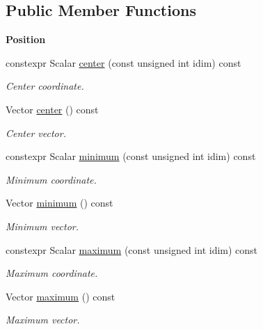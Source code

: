 \subsection*{Public Member Functions}
\begin{Indent}{\bf Position}\par
\begin{DoxyCompactItemize}
\item 
constexpr Scalar \hyperlink{classmagrathea_1_1AbstractHyperSphere_a3dd8d25adc4df0a1aa1878f3b3f48835}{center} (const unsigned int idim) const 
\begin{DoxyCompactList}\small\item\em Center coordinate. \end{DoxyCompactList}\item 
Vector \hyperlink{classmagrathea_1_1AbstractHyperSphere_af16c5565a4d7819aa6db90f599a264fd}{center} () const 
\begin{DoxyCompactList}\small\item\em Center vector. \end{DoxyCompactList}\item 
constexpr Scalar \hyperlink{classmagrathea_1_1AbstractHyperSphere_a9c76e88eea428b595fe1ca44c43bb4e4}{minimum} (const unsigned int idim) const 
\begin{DoxyCompactList}\small\item\em Minimum coordinate. \end{DoxyCompactList}\item 
Vector \hyperlink{classmagrathea_1_1AbstractHyperSphere_a1aec8b8788f5b20154efd0b9fa6bc75a}{minimum} () const 
\begin{DoxyCompactList}\small\item\em Minimum vector. \end{DoxyCompactList}\item 
constexpr Scalar \hyperlink{classmagrathea_1_1AbstractHyperSphere_a6242aa789a4de16158050321c3603c60}{maximum} (const unsigned int idim) const 
\begin{DoxyCompactList}\small\item\em Maximum coordinate. \end{DoxyCompactList}\item 
Vector \hyperlink{classmagrathea_1_1AbstractHyperSphere_a64995340d907a66c2f9b52efbcf719fd}{maximum} () const 
\begin{DoxyCompactList}\small\item\em Maximum vector. \end{DoxyCompactList}\end{DoxyCompactItemize}
\end{Indent}
